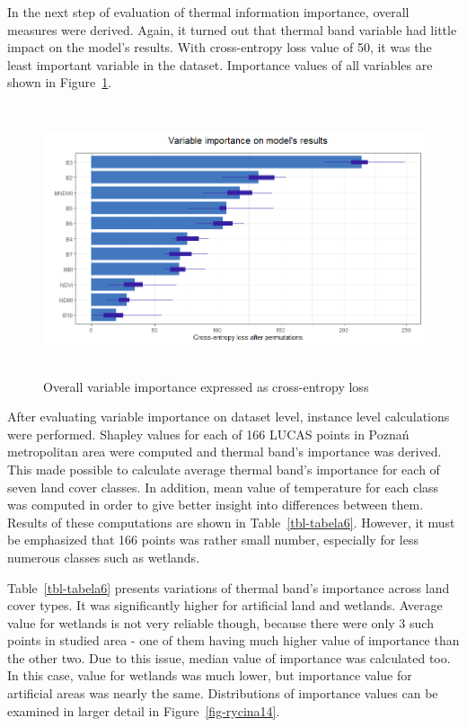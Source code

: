 \documentclass{amuthesis}
\begin{document}
In the next step of evaluation of thermal information importance,
overall measures were derived. Again, it turned out that thermal band
variable had little impact on the model's results. With cross-entropy
loss value of 50, it was the least important variable in the dataset.
Importance values of all variables are shown in
Figure~\ref{fig-rycina13}.

\begin{figure}[t]

{\centering \includegraphics[width=5.625in,height=3.125in]{./figures/importance.png}

}

\caption{\label{fig-rycina13}Overall variable importance expressed as
cross-entropy loss}

\end{figure}

After evaluating variable importance on dataset level, instance level
calculations were performed. Shapley values for each of 166 LUCAS points
in Poznań metropolitan area were computed and thermal band's importance
was derived. This made possible to calculate average thermal band's
importance for each of seven land cover classes. In addition, mean value
of temperature for each class was computed in order to give better
insight into differences between them. Results of these computations are
shown in Table~\ref{tbl-tabela6}. However, it must be emphasized that
166 points was rather small number, especially for less numerous classes
such as wetlands.

Table~\ref{tbl-tabela6} presents variations of thermal band's importance
across land cover types. It was significantly higher for artificial land
and wetlands. Average value for wetlands is not very reliable though,
because there were only 3 such points in studied area - one of them
having much higher value of importance than the other two. Due to this
issue, median value of importance was calculated too. In this case,
value for wetlands was much lower, but importance value for artificial
areas was nearly the same. Distributions of importance values can be
examined in larger detail in Figure~\ref{fig-rycina14}.
\end{document}
